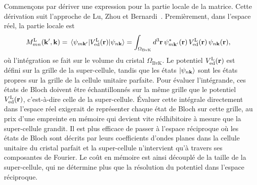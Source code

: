 Commençons par dériver une expression pour la partie locale de la matrice. Cette dérivation suit l'approche de Lu, Zhou et Bernardi~\cite{luEfficientInitioCalculations2019}. Premièrement, dans l'espace réel, la partie locale est
\begin{equation}
    M^\text{L}_{mn}(\kv',\kv) = \matrixel{\psi_{m\kv'}}{V_\text{ed}^\text{L}(\rv)}{\psi_{n\kv}} = \int_{\Omega_\text{BvK}}d^3\rv\,\psi_{m\kv'}^*(\rv)\,V^\text{L}_\text{ed}(\rv)\,\psi_{n\kv}(\rv),\label{eqn:ML_réel}
\end{equation}
où l'intégration se fait sur le volume du cristal $\Omega_\text{BvK}$. Le potentiel $V_\text{ed}^\text{L}(\mathbf{r})$ est défini sur la grille de la super-cellule, tandis que les états $\ket{\psi_{n\mathbf{k}}}$ sont les états propres sur la grille de la cellule unitaire parfaite. Pour évaluer l'intégrande, ces états de Bloch doivent être échantillonnés sur la même grille que le potentiel $V_\text{ed}^\text{L}(\mathbf{r})$, c'est-à-dire celle de la super-cellule. Évaluer cette intégrale directement dans l'espace réel exigerait de représenter chaque état de Bloch sur cette grille, au prix d'une empreinte en mémoire qui devient vite rédhibitoire à mesure que la super-cellule grandit. Il est plus efficace de passer à l'espace réciproque où les états de Bloch sont décrits par leurs coefficients d'ondes planes dans la cellule unitaire du cristal parfait et la super-cellule n'intervient qu'à travers ses composantes de Fourier. Le coût en mémoire est ainsi découplé de la taille de la super-cellule, qui ne détermine plus que la résolution du potentiel dans l'espace réciproque.

